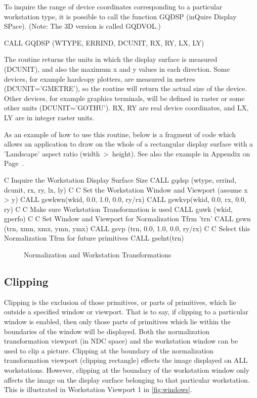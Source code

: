 To inquire the range of device coordinates corresponding to a particular
workstation type, it is possible to call the function GQDSP
(inQuire Display SPace). (Note: The 3D version is called GQDVOL.)
\begin{XMP}
CALL GQDSP (WTYPE, ERRIND, DCUNIT, RX, RY, LX, LY)
\end{XMP}
The routine returns the units in which the display surface
is measured (DCUNIT), and also the maximum x and y values
in each direction.
Some devices, for example hardcopy plotters, are measured in metres
(DCUNIT='GMETRE'), so the routine will return the actual size of the
device. Other devices, for example graphics terminals,
will be defined in raster or some other units (DCUNIT='GOTHU').
RX, RY are real device coordinates,
and LX, LY are in integer raster units.
 
As an example of how to use this routine, below is a fragment of code
which allows an application to draw on the whole of a rectangular
display surface with a 'Landscape' aspect ratio
(width~>~height).
See also the example in Appendix on Page~\pageref{sec:ex3dv}.
\begin{XMP}
C  Inquire the Workstation Display Surface Size
      CALL gqdsp (wtype, errind, dcunit, rx, ry, lx, ly)
C
C  Set the Workstation Window and Viewport (assume x > y)
      CALL gswkwn(wkid, 0.0, 1.0, 0.0, ry/rx)
      CALL gswkvp(wkid, 0.0, rx,  0.0, ry)
C
C  Make sure Workstation Transformation is used
      CALL guwk  (wkid, gperfo)
C
C  Set Window and Viewport for Normalization Tfrm 'trn'
      CALL gswn  (trn,  xmn, xmx, ymn, ymx)
      CALL gsvp  (trn,  0.0, 1.0, 0.0, ry/rx)
C
C  Select this Normalization Tfrm for future primitives
      CALL gselnt(trn)
\end{XMP}
\begin{figure}[h]
\caption{Normalization and Workstation Transformations}
\label{fig:trafos}
\end{figure}
\subsection{\protect\label{sec:nrmclp}Clipping}
 
Clipping is the exclusion of those primitives, or parts of primitives,
which lie outside a specified window or viewport. That is to say, if
clipping to a particular window is enabled, then only those parts of
primitives which lie within the boundaries of the window will be
displayed. Both the normalization transformation viewport (in NDC space)
and the workstation window can be used to clip a picture.
Clipping at the boundary of the normalization transformation viewport
(clipping rectangle) effects the image displayed on ALL workstations.
However, clipping at the boundary of the
workstation window only affects the image on the display surface
belonging to that particular workstation.
This is illustrated in Workstation Viewport 1 in \ref{fig:windows}.
 
